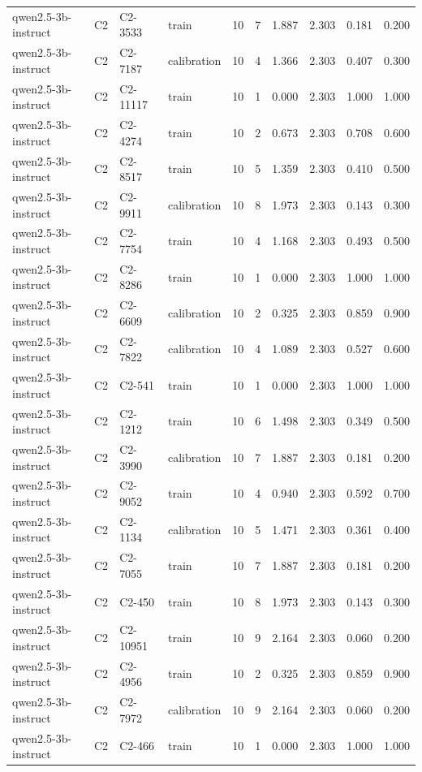 \begin{table}
\begin{tabular}{llllrrrrrr}
qwen2.5-3b-instruct & C2 & C2-3533 & train & 10 & 7 & 1.887 & 2.303 & 0.181 & 0.200 \\
qwen2.5-3b-instruct & C2 & C2-7187 & calibration & 10 & 4 & 1.366 & 2.303 & 0.407 & 0.300 \\
qwen2.5-3b-instruct & C2 & C2-11117 & train & 10 & 1 & 0.000 & 2.303 & 1.000 & 1.000 \\
qwen2.5-3b-instruct & C2 & C2-4274 & train & 10 & 2 & 0.673 & 2.303 & 0.708 & 0.600 \\
qwen2.5-3b-instruct & C2 & C2-8517 & train & 10 & 5 & 1.359 & 2.303 & 0.410 & 0.500 \\
qwen2.5-3b-instruct & C2 & C2-9911 & calibration & 10 & 8 & 1.973 & 2.303 & 0.143 & 0.300 \\
qwen2.5-3b-instruct & C2 & C2-7754 & train & 10 & 4 & 1.168 & 2.303 & 0.493 & 0.500 \\
qwen2.5-3b-instruct & C2 & C2-8286 & train & 10 & 1 & 0.000 & 2.303 & 1.000 & 1.000 \\
qwen2.5-3b-instruct & C2 & C2-6609 & calibration & 10 & 2 & 0.325 & 2.303 & 0.859 & 0.900 \\
qwen2.5-3b-instruct & C2 & C2-7822 & calibration & 10 & 4 & 1.089 & 2.303 & 0.527 & 0.600 \\
qwen2.5-3b-instruct & C2 & C2-541 & train & 10 & 1 & 0.000 & 2.303 & 1.000 & 1.000 \\
qwen2.5-3b-instruct & C2 & C2-1212 & train & 10 & 6 & 1.498 & 2.303 & 0.349 & 0.500 \\
qwen2.5-3b-instruct & C2 & C2-3990 & calibration & 10 & 7 & 1.887 & 2.303 & 0.181 & 0.200 \\
qwen2.5-3b-instruct & C2 & C2-9052 & train & 10 & 4 & 0.940 & 2.303 & 0.592 & 0.700 \\
qwen2.5-3b-instruct & C2 & C2-1134 & calibration & 10 & 5 & 1.471 & 2.303 & 0.361 & 0.400 \\
qwen2.5-3b-instruct & C2 & C2-7055 & train & 10 & 7 & 1.887 & 2.303 & 0.181 & 0.200 \\
qwen2.5-3b-instruct & C2 & C2-450 & train & 10 & 8 & 1.973 & 2.303 & 0.143 & 0.300 \\
qwen2.5-3b-instruct & C2 & C2-10951 & train & 10 & 9 & 2.164 & 2.303 & 0.060 & 0.200 \\
qwen2.5-3b-instruct & C2 & C2-4956 & train & 10 & 2 & 0.325 & 2.303 & 0.859 & 0.900 \\
qwen2.5-3b-instruct & C2 & C2-7972 & calibration & 10 & 9 & 2.164 & 2.303 & 0.060 & 0.200 \\
qwen2.5-3b-instruct & C2 & C2-466 & train & 10 & 1 & 0.000 & 2.303 & 1.000 & 1.000 \\

\end{tabular}
\end{table}
